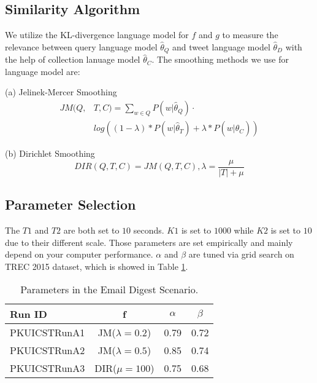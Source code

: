 \subsection{Similarity Algorithm}
We utilize the KL-divergence language model for $f$ and $g$ to measure the relevance between
query language model $\widehat{\theta}_Q$ and tweet language model $\widehat{\theta}_D$
with the help of collection lanuage model $\widehat{\theta}_C$.
The smoothing methods we use for language model are:

(a) Jelinek-Mercer Smoothing
\begin{equation}
\begin{aligned}
JM(Q,&T,C) = \sum_{w \in Q} P(w|\widehat{\theta}_Q) \cdot \\
&log \left( (1-\lambda) * P(w|\widehat{\theta}_T) + \lambda * P(w|\widehat{\theta}_C) \right)
\end{aligned}
\end{equation}

(b) Dirichlet Smoothing
\begin{equation}
DIR(Q,T,C) = JM(Q,T,C), \lambda = \frac{\mu}{|T| + \mu}
\end{equation}

\subsection{Parameter Selection}
The $T1$ and $T2$ are both set to $10$ seconds.
$K1$ is set to $1000$ while $K2$ is set to $10$ due to their different scale.
Those parameters are set empirically and mainly depend on your computer performance.
$\alpha$ and $\beta$ are tuned via grid search on TREC 2015 dataset,
which is showed in Table \ref{tab:paraA}.

\begin{table}[htbp]
\centering
\caption{Parameters in the Email Digest Scenario.}
\label{tab:paraA}
\begin{tabular}{lccc}
\hline
Run ID&f&$\alpha$&$\beta$\\
\hline
PKUICSTRunA1&JM($\lambda=0.2$)&0.79&0.72\\
PKUICSTRunA2&JM($\lambda=0.5$)&0.85&0.74\\
PKUICSTRunA3&DIR($\mu=100$)&0.75&0.68\\
\hline
\end{tabular}
\end{table}


